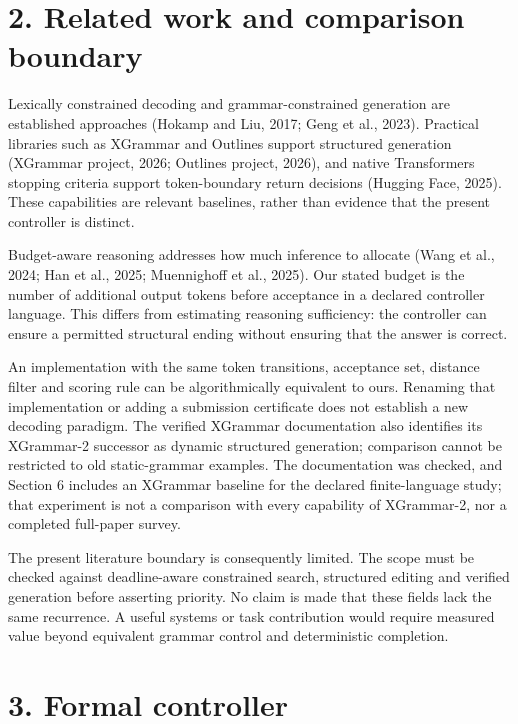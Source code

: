 \documentclass[
  12pt,
  a4paper,
]{article}
\begin{document}
\section{2. Related work and comparison
boundary}\label{related-work-and-comparison-boundary}

Lexically constrained decoding and grammar-constrained generation are
established approaches (Hokamp and Liu, 2017; Geng et al., 2023).
Practical libraries such as XGrammar and Outlines support structured
generation (XGrammar project, 2026; Outlines project, 2026), and native
Transformers stopping criteria support token-boundary return decisions
(Hugging Face, 2025). These capabilities are relevant baselines, rather
than evidence that the present controller is distinct.

Budget-aware reasoning addresses how much inference to allocate (Wang et
al., 2024; Han et al., 2025; Muennighoff et al., 2025). Our stated
budget is the number of additional output tokens before acceptance in a
declared controller language. This differs from estimating reasoning
sufficiency: the controller can ensure a permitted structural ending
without ensuring that the answer is correct.

An implementation with the same token transitions, acceptance set, distance filter and scoring rule can be algorithmically equivalent to ours. Renaming that implementation or adding a submission certificate does not establish a new decoding paradigm. The verified XGrammar documentation also identifies its XGrammar-2 successor as dynamic structured generation; comparison cannot be restricted to old static-grammar examples. The documentation was checked, and Section 6 includes an XGrammar baseline for the declared finite-language study; that experiment is not a comparison with every capability of XGrammar-2, nor a completed full-paper survey.

The present literature boundary is consequently limited. The scope must
be checked against deadline-aware constrained search, structured editing
and verified generation before asserting priority. No claim is made that
these fields lack the same recurrence. A useful systems or task
contribution would require measured value beyond equivalent grammar
control and deterministic completion.

\section{3. Formal controller}\label{formal-controller}
\end{document}
